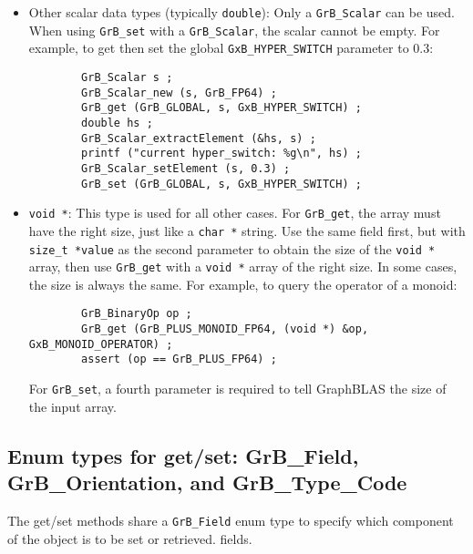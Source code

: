 \begin{itemize}
\item Other scalar data types (typically \verb'double'):
    Only a \verb'GrB_Scalar' can be used.  When using \verb'GrB_set' with a
    \verb'GrB_Scalar', the scalar cannot be empty.  For example, to get then
    set the global \verb'GxB_HYPER_SWITCH' parameter to 0.3: 

    {\footnotesize
    \begin{verbatim}
        GrB_Scalar s ;
        GrB_Scalar_new (s, GrB_FP64) ;
        GrB_get (GrB_GLOBAL, s, GxB_HYPER_SWITCH) ;
        double hs ;
        GrB_Scalar_extractElement (&hs, s) ;
        printf ("current hyper_switch: %g\n", hs) ;
        GrB_Scalar_setElement (s, 0.3) ;
        GrB_set (GrB_GLOBAL, s, GxB_HYPER_SWITCH) ; \end{verbatim} }

\item \verb'void *':
    This type is used for all other cases.
    For \verb'GrB_get', the array must have the right size, just like a
    \verb'char *' string.  Use the same field first, but with
    \verb'size_t *value' as the second parameter to obtain the size of the
    \verb'void *' array, then use \verb'GrB_get' with a \verb'void *' array of
    the right size.  In some cases, the size is always the same.  For example,
    to query the operator of a monoid:

    {\footnotesize
    \begin{verbatim}
        GrB_BinaryOp op ;
        GrB_get (GrB_PLUS_MONOID_FP64, (void *) &op, GxB_MONOID_OPERATOR) ;
        assert (op == GrB_PLUS_FP64) ; \end{verbatim} }

    For \verb'GrB_set', a fourth parameter is required to tell GraphBLAS the
    size of the input array.

\end{itemize}

\subsection{Enum types for get/set: {\sf GrB\_Field}, {\sf GrB\_Orientation},
and {\sf GrB\_Type\_Code}}
\label{get_set_enums}

The get/set methods share a \verb'GrB_Field' enum type to specify which
component of the object is to be set or retrieved.
fields.


